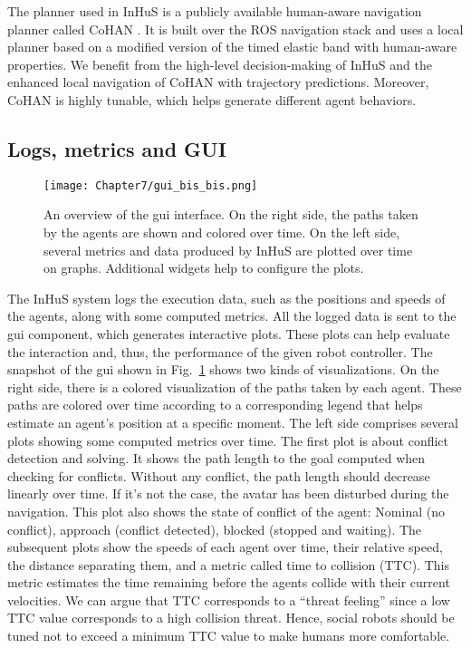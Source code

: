 The planner used in InHuS is a publicly available human-aware navigation planner called CoHAN \cite{singamaneni2021human}. It is built over the ROS navigation stack and uses a local planner based on a modified version of the timed elastic band with human-aware properties. 
We benefit from the high-level decision-making of InHuS and the enhanced local navigation of CoHAN with trajectory predictions. Moreover, CoHAN is highly tunable, which helps generate different agent behaviors. 

\subsection{Logs, metrics and GUI} \label{sec:logs_metrics}

\begin{figure}[!b]
    \centering
    \texttt{[image: Chapter7/gui\_bis\_bis.png]}
    \caption{
    An overview of the \acrshort{gui} interface. On the right side, the paths taken by the agents are shown and colored over time. On the left side, several metrics and data produced by InHuS are plotted over time on graphs. Additional widgets help to configure the plots. 
    }
    \label{fig:gui}
\end{figure}

The InHuS system logs the execution data, such as the positions and speeds of the agents, along with some computed metrics. All the logged data is sent to the \acrshort{gui} component, which generates interactive plots. These plots can help evaluate the interaction and, thus, the performance of the given robot controller. The snapshot of the \acrshort{gui} shown in Fig.~\ref{fig:gui} shows two kinds of visualizations. On the right side, there is a colored visualization of the paths taken by each agent. These paths are colored over time according to a corresponding legend that helps estimate an agent's position at a specific moment. The left side comprises several plots showing some computed metrics over time. The first plot is about conflict detection and solving. It shows the path length to the goal computed when checking for conflicts. Without any conflict, the path length should decrease linearly over time. If it's not the case, the avatar has been disturbed during the navigation. This plot also shows the state of conflict of the agent: Nominal (no conflict), approach (conflict detected), blocked (stopped and waiting). The subsequent plots show the speeds of each agent over time, their relative speed, the distance separating them, 
and a metric called time to collision (TTC). This metric estimates the time remaining before the agents collide with their current velocities. We can argue that TTC corresponds to a ``threat feeling'' since a low TTC value corresponds to a high collision threat. Hence, social robots should be tuned not to exceed a minimum TTC value to make humans more comfortable.

